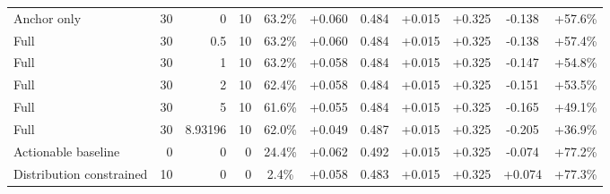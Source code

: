 \begin{table}[htbp]
\begin{tabular}{lrrrccccccc}
Anchor only & 30 & 0 & 10 & 63.2\% & +0.060 & 0.484 & +0.015 & +0.325 & -0.138 & +57.6\% \\
Full & 30 & 0.5 & 10 & 63.2\% & +0.060 & 0.484 & +0.015 & +0.325 & -0.138 & +57.4\% \\
Full & 30 & 1 & 10 & 63.2\% & +0.058 & 0.484 & +0.015 & +0.325 & -0.147 & +54.8\% \\
Full & 30 & 2 & 10 & 62.4\% & +0.058 & 0.484 & +0.015 & +0.325 & -0.151 & +53.5\% \\
Full & 30 & 5 & 10 & 61.6\% & +0.055 & 0.484 & +0.015 & +0.325 & -0.165 & +49.1\% \\
Full & 30 & 8.93196 & 10 & 62.0\% & +0.049 & 0.487 & +0.015 & +0.325 & -0.205 & +36.9\% \\
Actionable baseline & 0 & 0 & 0 & 24.4\% & +0.062 & 0.492 & +0.015 & +0.325 & -0.074 & +77.2\% \\
Distribution constrained & 10 & 0 & 0 & 2.4\% & +0.058 & 0.483 & +0.015 & +0.325 & +0.074 & +77.3\% \\
\bottomrule
\end{tabular}
\end{table}